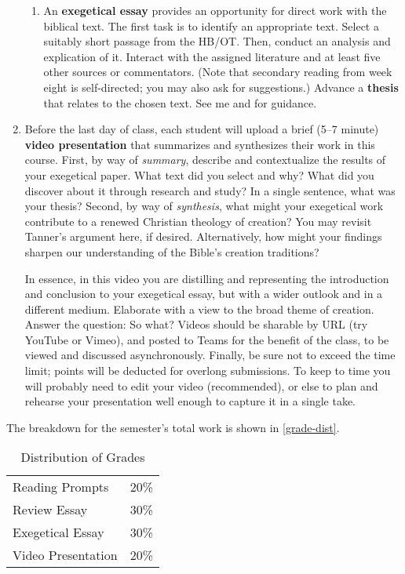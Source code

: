 \documentclass[titlepage]{article}
\begin{document}
\begin{enumerate}
\begin{enumerate}
		\item An \textbf{exegetical essay} provides an opportunity for
		direct work with the biblical text. The first task is to
		identify an appropriate text. Select a suitably short passage
		from the HB/OT. Then, conduct an analysis and explication of it.
		Interact with the assigned literature and at least five other
		sources or commentators. (Note that secondary reading from week
		eight is self-directed; you may also ask for suggestions.)
		Advance a \textbf{thesis} that relates to the chosen text. See
		me and \cite[chs 3, 5, 8, 11]{rlgs} for guidance.

	\end{enumerate}

	\item Before the last day of class, each student will upload a brief
	(5--7 minute) \textbf{video presentation} that summarizes and
	synthesizes their work in this course. First, by way of
	\emph{summary}, describe and contextualize the results of your
	exegetical paper. What text did you select and why? What did you
	discover about it through research and study? In a single sentence,
	what was your thesis? Second, by way of \emph{synthesis}, what might
	your exegetical work contribute to a renewed Christian theology of
	creation? You may revisit Tanner's argument here, if desired.
	Alternatively, how might your findings sharpen our understanding of
	the Bible's creation traditions?

	In essence, in this video you are distilling and representing the
	introduction and conclusion to your exegetical essay, but with a
	wider outlook and in a different medium. Elaborate with a view to
	the broad theme of creation. Answer the question: So what? Videos
	should be sharable by URL (try YouTube or Vimeo), and posted to
	Teams for the benefit of the class, to be viewed and discussed
	asynchronously. Finally, be sure not to exceed the time limit;
	points will be deducted for overlong submissions. To keep to time
	you will probably need to edit your video (recommended), or else to
	plan and rehearse your presentation well enough to capture it in a
	single take.

\end{enumerate}

The breakdown for the semester's total work is shown in
\autoref{grade-dist}.

\begin{table}[htbp]
  \centering
  {\lining
  \begin{tabular}{lr}
    \toprule
    Reading Prompts    & 20\% \\
    Review Essay       & 30\% \\
    Exegetical Essay   & 30\% \\
    Video Presentation & 20\% \\
    \bottomrule
  \end{tabular}}
  \caption{Distribution of Grades}
  \label{grade-dist}
\end{table}
\end{document}
